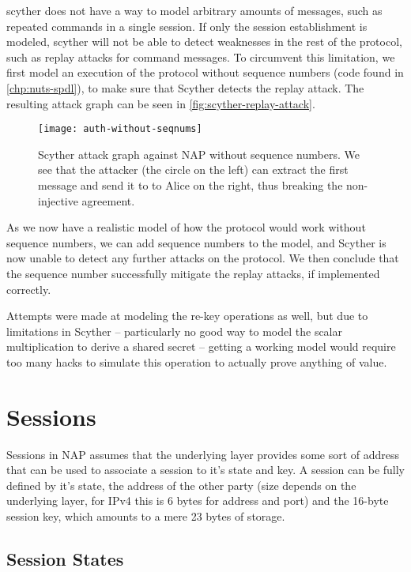 \gls{scyther} does not have a way to model arbitrary amounts of messages, such as repeated commands in a single session. If only the session establishment is modeled, \gls{scyther} will not be able to detect weaknesses in the rest of the protocol, such as replay attacks for command messages. To circumvent this limitation, we first model an execution of the protocol without sequence numbers (code found in \autoref{chp:nuts-spdl}), to make sure that Scyther detects the replay attack. The resulting attack graph can be seen in \autoref{fig:scyther-replay-attack}.

\begin{figure}[ht!]
\centering
\texttt{[image: auth-without-seqnums]}
\caption{Scyther attack graph against NAP without sequence numbers. We see that the attacker (the circle on the left) can extract the first message and send it to to Alice on the right, thus breaking the non-injective agreement.}\label{fig:scyther-replay-attack}
\end{figure}

As we now have a realistic model of how the protocol would work without sequence numbers, we can add sequence numbers to the model, and Scyther is now unable to detect any further attacks on the protocol. We then conclude that the sequence number successfully mitigate the replay attacks, if implemented correctly.

Attempts were made at modeling the re-key operations as well, but due to limitations in Scyther -- particularly no good way to model the scalar multiplication to derive a shared secret -- getting a working model would require too many hacks to simulate this operation to actually prove anything of value.


\section{Sessions}

Sessions in NAP assumes that the underlying layer provides some sort of address that can be used to associate a session to it's state and key. A session can be fully defined by it's state, the address of the other party (size depends on the underlying layer, for IPv4 this is 6 bytes for address and port) and the 16-byte session key, which amounts to a mere 23 bytes of storage.


    \subsection{Session States}

